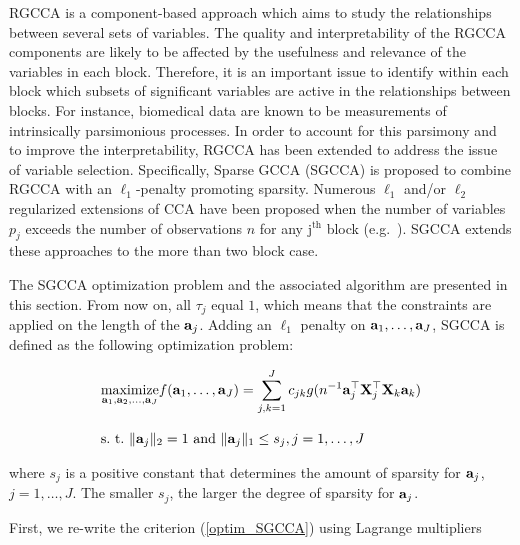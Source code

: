 \documentclass[
]{jss}
\begin{document}
RGCCA is a component-based approach which aims to study the
relationships between several sets of variables. The quality and
interpretability of the RGCCA components are likely to be affected by
the usefulness and relevance of the variables in each block. Therefore,
it is an important issue to identify within each block which subsets of
significant variables are active in the relationships between blocks.
For instance, biomedical data are known to be measurements of
intrinsically parsimonious processes. In order to account for this
parsimony and to improve the interpretability, RGCCA has been extended
to address the issue of variable selection. Specifically, Sparse GCCA
(SGCCA) is proposed to combine RGCCA with an \(\ell_1\)-penalty
promoting sparsity. Numerous \(\ell_1\) and/or \(\ell_2\) regularized
extensions of CCA have been proposed when the number of variables
\(p_j\) exceeds the number of observations \(n\) for any
\(\text{j}^\text{th}\) block
(e.g.~\citep{Vinod1976, Waaijenborg2008, Parkhomenko2009, LeCao2009,
Witten2009a, Lykou2010, Hardoon2011}). SGCCA extends these approaches to
the more than two block case.

The SGCCA optimization problem and the associated algorithm are
presented in this section. From now on, all \(\tau_j\) equal \(1\),
which means that the constraints are applied on the length of the
\(\mathbf{a}_j\). Adding an \(\ell_1\) penalty on \(\mathbf{a}_1,\ldots, \mathbf{a}_J\),
SGCCA is defined as the following optimization problem:

\begin{equation}
\begin{array}{l}
\displaystyle \underset{\mathbf{a}_1,\mathbf{a}_2, \ldots,\mathbf{a}_J}{\text{maximize}} f(\mathbf{a}_1, \ldots,\mathbf{a}_J)=\sum_{j, k = 1}^J c_{jk}g(n^{-1}\mathbf{a}_j^\top \mathbf{X}_j^\top \mathbf{X}_k\mathbf{a}_k)\\\\
\mathrm{s.~t.~} \Vert \mathbf{a}_j \Vert_2 = 1 \text{~and~} \Vert \mathbf{a}_j \Vert_1 \le s_j, j=1,\ldots,J
\end{array}
\label{optim_SGCCA}
\end{equation}

where \(s_j\) is a positive constant that determines the amount of
sparsity for \(\mathbf{a}_j\), \(j=1, \ldots, J\). The smaller \(s_j\), the
larger the degree of sparsity for \(\mathbf{a}_j\).

First, we re-write the criterion (\ref{optim_SGCCA}) using Lagrange
multipliers
\end{document}
